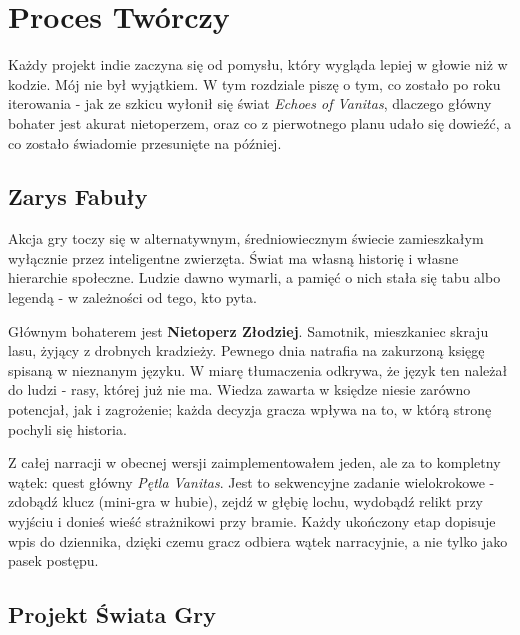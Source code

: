 \chapter{Proces Twórczy}

Każdy projekt indie zaczyna się od pomysłu, który wygląda lepiej w głowie niż w kodzie. Mój nie był wyjątkiem. W tym rozdziale piszę o tym, co zostało po roku iterowania - jak ze szkicu wyłonił się świat \textit{Echoes of Vanitas}, dlaczego główny bohater jest akurat nietoperzem, oraz co z pierwotnego planu udało się dowieźć, a co zostało świadomie przesunięte na później.

\section{Zarys Fabuły}

Akcja gry toczy się w alternatywnym, średniowiecznym świecie zamieszkałym wyłącznie przez inteligentne zwierzęta. Świat ma własną historię i własne hierarchie społeczne. Ludzie dawno wymarli, a pamięć o nich stała się tabu albo legendą - w zależności od tego, kto pyta.

Głównym bohaterem jest \textbf{Nietoperz Złodziej}. Samotnik, mieszkaniec skraju lasu, żyjący z drobnych kradzieży. Pewnego dnia natrafia na zakurzoną księgę spisaną w nieznanym języku. W miarę tłumaczenia odkrywa, że język ten należał do ludzi - rasy, której już nie ma. Wiedza zawarta w księdze niesie zarówno potencjał, jak i zagrożenie; każda decyzja gracza wpływa na to, w którą stronę pochyli się historia.

Z całej narracji w obecnej wersji zaimplementowałem jeden, ale za to kompletny wątek: quest główny \textit{Pętla Vanitas}. Jest to sekwencyjne zadanie wielokrokowe - zdobądź klucz (mini-gra w hubie), zejdź w głębię lochu, wydobądź relikt przy wyjściu i donieś wieść strażnikowi przy bramie. Każdy ukończony etap dopisuje wpis do dziennika, dzięki czemu gracz odbiera wątek narracyjnie, a nie tylko jako pasek postępu.

\section{Projekt Świata Gry}

